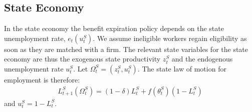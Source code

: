 \documentclass[12pt]{article}
\newcommand{\1}{\mathbf{1}}
\newcommand{\ust}{u^S_t}
\newcommand{\zst}{z^S_t}
\newcommand{\tst}{\theta^S_t}
\newcommand{\ost}{\Omega^S_t}
\begin{document}
\begin{appendix}
\subsection{State Economy}

In the state economy the benefit expiration policy depends on the state unemployment rate, $e_t(\ust)$.  We assume ineligible workers regain eligibility as soon as they are matched with a firm.  The relevant state variables for the state economy are thus the exogenous state productivity $\zst$ and the endogenous unemployment rate $\ust$.  Let $\ost=(\zst,\ust)$. The state law of motion for employment is therefore:
\begin{eqnarray}
L^S_{t+1}(\ost)=(1-\delta)L^S_{t}+f(\tst)\left(1-L^S_t\right) \label{LOML}
\end{eqnarray}
and $\ust=1-L^S_t$.


\end{appendix}
\end{document}
